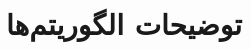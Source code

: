 \documentclass[a4paper,12pt]{report}
\begin{document}
	\chapter{
		توضیحات الگوریتم‌ها
	}\label{chap3}








	\nocite{*}
	
	
\end{document}
